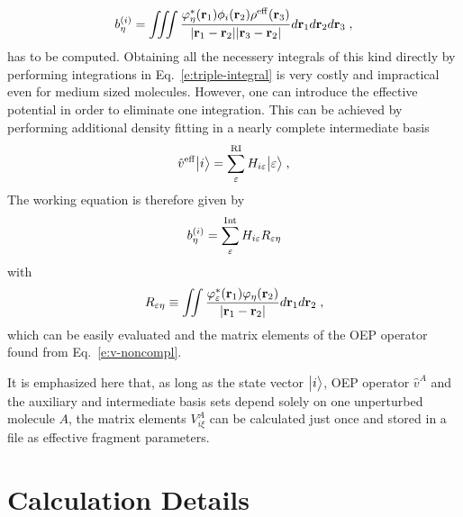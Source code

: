 %
\begin{equation} \label{e:triple-integral}
 b^{(i)}_\eta = \iiint 
           \frac{ \varphi^*_\eta({\bf r}_1) \phi_i({\bf r}_2)  \rho^{\rm eff}({\bf r}_3) }
            {\vert {\bf r}_1 - {\bf r}_2 \vert \vert {\bf r}_3 - {\bf r}_2 \vert}
           d{\bf r}_1 d{\bf r}_2 d{\bf r}_3 \;,
\end{equation}
%
has to be computed.
Obtaining all the necessery integrals of this kind directly 
by performing integrations in Eq.~\eqref{e:triple-integral} is very costly 
and impractical even for medium sized molecules. 
However, one can introduce the effective potential in order to eliminate one integration. 
This can be achieved by performing additional density fitting in a nearly complete intermediate basis 
%
\begin{equation}
 \hat{v}^{\rm eff} \Ket{i} = \sum_\varepsilon^{\rm RI} H_{i\varepsilon} \Ket{\varepsilon} \;,
\end{equation}
%
The working equation is therefore given by
%
\begin{equation}
 b^{(i)}_\eta = \sum_\varepsilon^{\rm Int} H_{i\varepsilon} R_{\varepsilon\eta} 
\end{equation}
%
with
%
\begin{equation}
 R_{\varepsilon\eta} \equiv \iint 
                       \frac{ \varphi^*_\varepsilon({\bf r}_1) \varphi_\eta({\bf r}_2) } 
                            {\vert {\bf r}_1 - {\bf r}_2\vert}  
                 d{\bf r}_1 d{\bf r}_2 \;,
\end{equation}
%
which can be easily evaluated and the matrix elements of the OEP operator found
from Eq.~\eqref{e:v-noncompl}.

It is emphasized here that, as long as the state vector $\Ket{i}$, OEP operator $\hat{v}^A$ 
and the auxiliary and intermediate basis sets depend solely on one unperturbed molecule $A$, the matrix elements
$V^A_{i\xi}$ can be calculated just once and stored in a file as effective fragment parameters.


\section{\label{s:4}Calculation Details}

